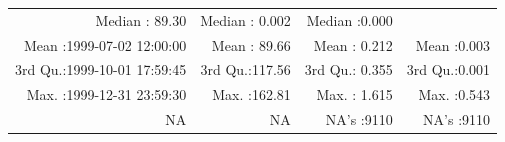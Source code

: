 \documentclass[
  10pt,
  a4paper,oneside]{article}
\begin{document}
\begin{longtable}[]{@{}rrrr@{}}
\begin{minipage}[t]{0.19\columnwidth}
Median : 89.30\strut
\end{minipage} & \begin{minipage}[t]{0.19\columnwidth}\raggedleft
Median : 0.002\strut
\end{minipage} & \begin{minipage}[t]{0.19\columnwidth}\raggedleft
Median :0.000\strut
\end{minipage}\tabularnewline
\begin{minipage}[t]{0.33\columnwidth}\raggedleft
Mean :1999-07-02 12:00:00\strut
\end{minipage} & \begin{minipage}[t]{0.19\columnwidth}\raggedleft
Mean : 89.66\strut
\end{minipage} & \begin{minipage}[t]{0.19\columnwidth}\raggedleft
Mean : 0.212\strut
\end{minipage} & \begin{minipage}[t]{0.19\columnwidth}\raggedleft
Mean :0.003\strut
\end{minipage}\tabularnewline
\begin{minipage}[t]{0.33\columnwidth}\raggedleft
3rd Qu.:1999-10-01 17:59:45\strut
\end{minipage} & \begin{minipage}[t]{0.19\columnwidth}\raggedleft
3rd Qu.:117.56\strut
\end{minipage} & \begin{minipage}[t]{0.19\columnwidth}\raggedleft
3rd Qu.: 0.355\strut
\end{minipage} & \begin{minipage}[t]{0.19\columnwidth}\raggedleft
3rd Qu.:0.001\strut
\end{minipage}\tabularnewline
\begin{minipage}[t]{0.33\columnwidth}\raggedleft
Max. :1999-12-31 23:59:30\strut
\end{minipage} & \begin{minipage}[t]{0.19\columnwidth}\raggedleft
Max. :162.81\strut
\end{minipage} & \begin{minipage}[t]{0.19\columnwidth}\raggedleft
Max. : 1.615\strut
\end{minipage} & \begin{minipage}[t]{0.19\columnwidth}\raggedleft
Max. :0.543\strut
\end{minipage}\tabularnewline
\begin{minipage}[t]{0.33\columnwidth}\raggedleft
NA\strut
\end{minipage} & \begin{minipage}[t]{0.19\columnwidth}\raggedleft
NA\strut
\end{minipage} & \begin{minipage}[t]{0.19\columnwidth}\raggedleft
NA's :9110\strut
\end{minipage} & \begin{minipage}[t]{0.19\columnwidth}\raggedleft
NA's :9110\strut
\end{minipage}\tabularnewline
\bottomrule
\end{longtable}
\end{document}
